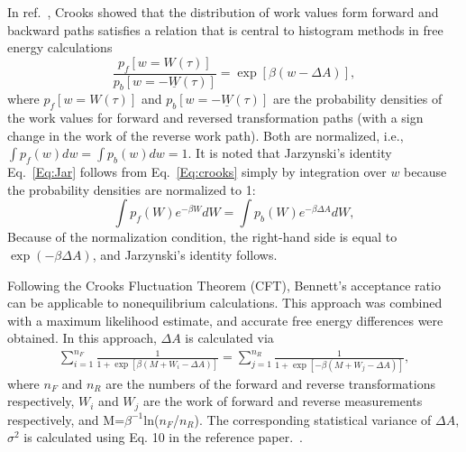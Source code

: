 In ref.~\cite{CrooksJSP1998}, Crooks showed that the distribution of work values form forward and backward paths satisfies a relation that is central to histogram methods in free energy calculations
\begin{equation}
\frac{p_{f}[w=W(\tau)]}{p_{b}[w=-\underline{W}(\tau)]}=\exp[\beta(w-\Delta A)],
\label{Eq:crooks}
\end{equation}
where $p_{f}[w=W(\tau)]$ and $p_{b}[w=-\underline{W}(\tau)]$ are the probability densities of the work values for forward and reversed transformation paths (with a sign change in the work of the reverse work path). Both are normalized, i.e., $\int p_{f}(w) dw=\int p_{b}(w) dw=1$. It is noted that Jarzynski's identity Eq.~\ref{Eq:Jar} follows from Eq.~\ref{Eq:crooks} simply by integration over $w$ because the probability densities are normalized to 1:
\begin{equation}
\int p_{f}(W)e^{-\beta W}dW=\int p_{b}(W)e^{-\beta \Delta A}dW,
\label{Eq:crookstojar}
\end{equation}
Because of the normalization condition, the right-hand side is equal to $\exp(-\beta \Delta A)$, and Jarzynski's identity follows.

Following the Crooks Fluctuation Theorem (CFT),\cite{CrooksJSP1998} Bennett’s acceptance ratio can be applicable to nonequilibrium calculations. This approach was combined with a maximum likelihood estimate, and accurate free energy differences were obtained.\cite{ShirtsPRL2003}
In this approach, $\Delta A$ is calculated via
\begin{align}
\sum_{i=1}^{n_{F}}\frac{1}{1+\exp \left[\beta(M+W_{i}-\Delta A)\right]} = \sum_{j=1}^{n_{R}}\frac{1}{1+\exp \left[-\beta(M+W_{j}-\Delta A)\right]},
\label{Eq:NEBAR}
\end{align}
where $n_{F}$ and $n_{R}$ are the numbers of the forward and reverse transformations respectively, $W_{i}$ and $W_{j}$ are the work of forward and reverse measurements respectively, and M=$\beta^{-1}$ln($n_{F}$/$n_{R}$).
The corresponding statistical variance of $ \Delta A $, $ \sigma^2 $ is calculated using Eq. 10 in the reference paper.~\cite{ShirtsPRL2003}.